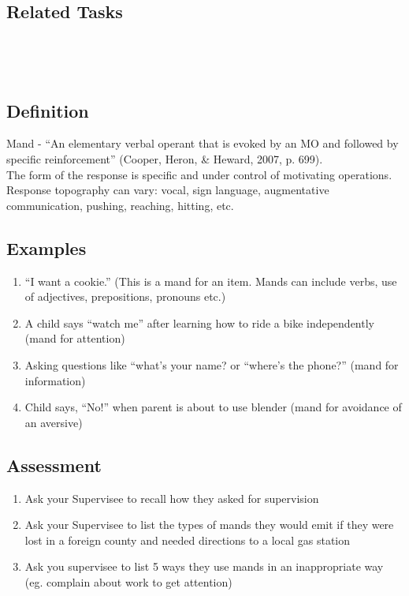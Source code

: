 \subsection{Related Tasks}
\fourdFour{}\\
\fourdTen{}\\
%
%
%
%
\section{\fourFKFourtyFour{}}
\subsection{Definition}
Mand - ``An elementary verbal operant that is evoked by an MO and followed by specific reinforcement'' (Cooper, Heron, \& Heward, 2007, p. 699).\\

The form of the response is specific and under control of motivating operations. Response topography can vary: vocal, sign language, augmentative communication, pushing, reaching, hitting, etc.
%
\subsection{Examples}
\begin{enumerate}
\item ``I want a cookie.'' (This is a mand for an item. Mands can include verbs, use of adjectives, prepositions, pronouns etc.)
\item A child says ``watch me'' after learning how to ride a bike independently (mand for attention)
\item Asking questions like ``what's your name? or ``where's the phone?'' (mand for information)
\item Child says, ``No!'' when parent is about to use blender (mand for avoidance of an aversive)
%

%
\end{enumerate}
%
\subsection{Assessment}
\begin{enumerate}
\item Ask your Supervisee to recall how they asked for supervision
\item Ask your Supervisee to list the types of mands they would emit if they were lost in a foreign county and needed directions to a local gas station
\item Ask you supervisee to list 5 ways they use mands in an inappropriate way (eg. complain about work to get attention)
%
\end{enumerate}
%
